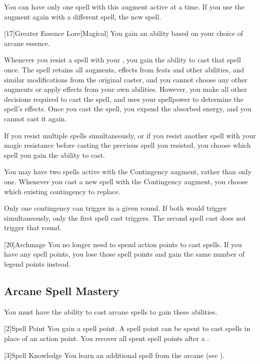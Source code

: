        You can have only one spell with this augment active at a time.
        If you use the augment again with a different spell, the new spell.

        [17]{Greater Essence Lore}[Magical]
        You gain an ability based on your choice of arcane essence.

         Whenever you resist a spell with your , you gain the ability to cast that spell once.
        The spell retains all augments, effects from feats and other abilities, and similar modifications from the original caster, and you cannot choose any other augments or apply effects from your own abilities.
        However, you make all other decisions required to cast the spell, and uses your spellpower to determine the spell's effects.
        Once you cast the spell, you expend the absorbed energy, and you cannot cast it again.

        If you resist multiple spells simultaneously, or if you resist another spell with your magic resistance before casting the previous spell you resisted, you choose which spell you gain the ability to cast.

         You may have two spells active with the Contingency augment, rather than only one.
        Whenever you cast a new spell with the Contingency augment, you choose which existing contingency to replace.

        Only one contingency can trigger in a given round.
        If both would trigger simultaneously, only the first spell cast triggers.
        The second spell cast does not trigger that round.

        [20]{Archmage}
        You no longer need to spend action points to cast spells.
        If you have any spell points, you lose those spell points and gain the same number of legend points instead.

    \subsection{Arcane Spell Mastery}
        You must have the ability to cast arcane spells to gain these abilities.

        [2]{Spell Point}
        You gain a spell point.
        A spell point can be spent to cast spells in place of an action point.
        You recover all spent spell points after a .

        [3]{Spell Knowledge} 
        You learn an additional spell from the arcane  (see ).

